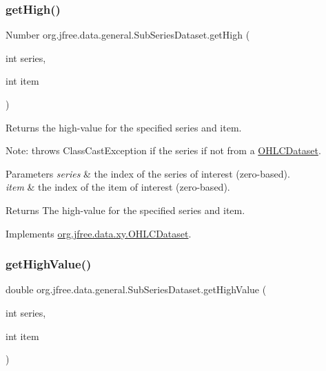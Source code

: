 \subsubsection{\texorpdfstring{get\+High()}{getHigh()}}
{\footnotesize\ttfamily Number org.\+jfree.\+data.\+general.\+Sub\+Series\+Dataset.\+get\+High (\begin{DoxyParamCaption}\item[{int}]{series,  }\item[{int}]{item }\end{DoxyParamCaption})}

Returns the high-\/value for the specified series and item. 

Note\+: throws {\ttfamily Class\+Cast\+Exception} if the series if not from a \mbox{\hyperlink{}{O\+H\+L\+C\+Dataset}}.


\begin{DoxyParams}{Parameters}
{\em series} & the index of the series of interest (zero-\/based). \\
\hline
{\em item} & the index of the item of interest (zero-\/based).\\
\hline
\end{DoxyParams}
\begin{DoxyReturn}{Returns}
The high-\/value for the specified series and item. 
\end{DoxyReturn}


Implements \mbox{\hyperlink{interfaceorg_1_1jfree_1_1data_1_1xy_1_1_o_h_l_c_dataset_a03f647b09b1a04ae0c2eb2bc5116d4d4}{org.\+jfree.\+data.\+xy.\+O\+H\+L\+C\+Dataset}}.

\mbox{\label{classorg_1_1jfree_1_1data_1_1general_1_1_sub_series_dataset_a63283b86bacb75de07fd3e4e8b5eae5b}} 
\subsubsection{\texorpdfstring{get\+High\+Value()}{getHighValue()}}
{\footnotesize\ttfamily double org.\+jfree.\+data.\+general.\+Sub\+Series\+Dataset.\+get\+High\+Value (\begin{DoxyParamCaption}\item[{int}]{series,  }\item[{int}]{item }\end{DoxyParamCaption})}

